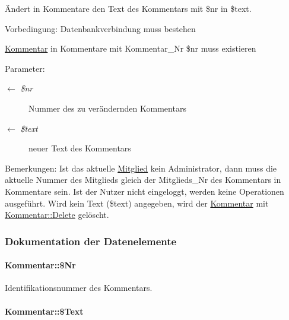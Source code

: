 Ändert in Kommentare den Text des Kommentars mit \$nr in \$text. \begin{Desc}
\item[Vorbedingung:]Datenbankverbindung muss bestehen 

\hyperlink{classKommentar}{Kommentar} in Kommentare mit Kommentar\_\-Nr \$nr muss existieren \end{Desc}
\begin{Desc}
\item[Parameter:]
\begin{description}
\item[\mbox{$\leftarrow$} {\em \$nr}]Nummer des zu verändernden Kommentars \item[\mbox{$\leftarrow$} {\em \$text}]neuer Text des Kommentars \end{description}
\end{Desc}
\begin{Desc}
\item[Bemerkungen:]Ist das aktuelle \hyperlink{classMitglied}{Mitglied} kein Administrator, dann muss die aktuelle Nummer des Mitglieds gleich der Mitglieds\_\-Nr des Kommentars in Kommentare sein. Ist der Nutzer nicht eingeloggt, werden keine Operationen ausgeführt. Wird kein Text (\$text) angegeben, wird der \hyperlink{classKommentar}{Kommentar} mit \hyperlink{classKommentar_31c1fdfb4fb8f24e0016c8ddb98ddcdc}{Kommentar::Delete} gelöscht. \end{Desc}


\subsubsection{Dokumentation der Datenelemente}
\hypertarget{classKommentar_1b0a3cfcb9fc7075f985cc8067ab1982}{
\paragraph[\$Nr]{\setlength{\rightskip}{0pt plus 5cm}Kommentar::\$Nr}\hfill}
\label{classKommentar_1b0a3cfcb9fc7075f985cc8067ab1982}


Identifikationsnummer des Kommentars. 

\hypertarget{classKommentar_c9a481413d6ba0c000719ad514bad4b5}{
\paragraph[\$Text]{\setlength{\rightskip}{0pt plus 5cm}Kommentar::\$Text}\hfill}
\label{classKommentar_c9a481413d6ba0c000719ad514bad4b5}


